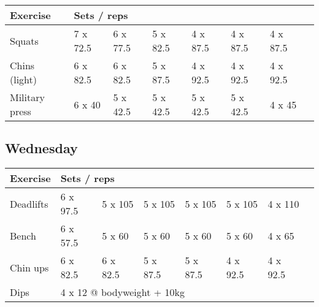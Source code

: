 \documentclass[12pt, a4paper]{article}%
\begin{document}
  \begin{tabular}{l|lllllll}
  \hspace{0.75em} \textbf{Exercise} & \multicolumn{ 7 }{l}{ \textbf{Sets / reps} } \\ \hline

            \hspace{0.75em} Squats
            & 7 x 72.5
            & 6 x 77.5
            & 5 x 82.5
            & 4 x 87.5
            & 4 x 87.5
            & 4 x 87.5
            & 
            \\


            \hspace{0.75em} Chins (light)
            & 6 x 82.5
            & 6 x 82.5
            & 5 x 87.5
            & 4 x 92.5
            & 4 x 92.5
            & 4 x 92.5
            & 
            \\


            \hspace{0.75em} Military press
            & 6 x 40
            & 5 x 42.5
            & 5 x 42.5
            & 5 x 42.5
            & 5 x 42.5
            & 4 x 45
            & 
            \\


  \end{tabular}

  \subsection*{\hspace{0.5em} Wednesday }


  \begin{tabular}{l|lllllll}
  \hspace{0.75em} \textbf{Exercise} & \multicolumn{ 7 }{l}{ \textbf{Sets / reps} } \\ \hline

            \hspace{0.75em} Deadlifts
            & 6 x 97.5
            & 5 x 105
            & 5 x 105
            & 5 x 105
            & 5 x 105
            & 4 x 110
            & 
            \\


            \hspace{0.75em} Bench
            & 6 x 57.5
            & 5 x 60
            & 5 x 60
            & 5 x 60
            & 5 x 60
            & 4 x 65
            & 
            \\


            \hspace{0.75em} Chin ups
            & 6 x 82.5
            & 6 x 82.5
            & 5 x 87.5
            & 5 x 87.5
            & 4 x 92.5
            & 4 x 92.5
            & 
            \\


   \hspace{0.75em} Dips &  \multicolumn{ 7 }{l}{ 4 x 12 @ bodyweight + 10kg } \\
  \end{tabular}
\end{document}
